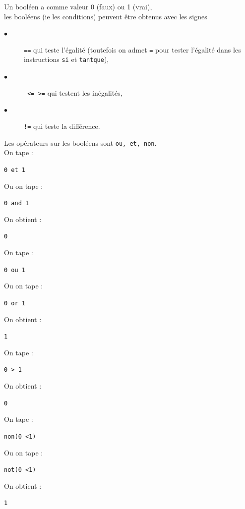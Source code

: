 \documentclass[a4paper,11pt]{book}
\begin{document}
Un bool\'een a comme valeur 0 (faux) ou 1 (vrai),\\
les bool\'eens (ie les conditions) peuvent \^etre obtenus avec les signes 
\begin{description}
\item[$\bullet$] {\tt ==}  qui teste l'\'egalit\'e (toutefois on admet {\tt =} pour tester 
l'\'egalit\'e dans les instructions {\tt si} et {\tt tantque}),
\item[$\bullet$] {\tt  < > <= >=} qui testent les in\'egalit\'es,
\item[$\bullet$] {\tt !=} qui teste la diff\'erence.
\end{description}
Les op\'erateurs sur les bool\'eens sont {\tt ou, et, non}.\\
On tape :
\begin{center}{\tt 0 et 1}\end{center}
Ou on tape :
\begin{center}{\tt 0 and 1}\end{center}
On obtient :
\begin{center}{\tt 0}\end{center}
On tape :
\begin{center}{\tt 0 ou 1}\end{center}
Ou on tape :
\begin{center}{\tt 0 or 1}\end{center}
On obtient :
\begin{center}{\tt 1}\end{center}
On tape :
\begin{center}{\tt 0 > 1}\end{center}
On obtient :
\begin{center}{\tt 0}\end{center}
On tape :
\begin{center}{\tt non(0 <1)}\end{center}
Ou on tape :
\begin{center}{\tt not(0 <1)}\end{center}
On obtient :
\begin{center}{\tt 1}\end{center}
\end{document}
